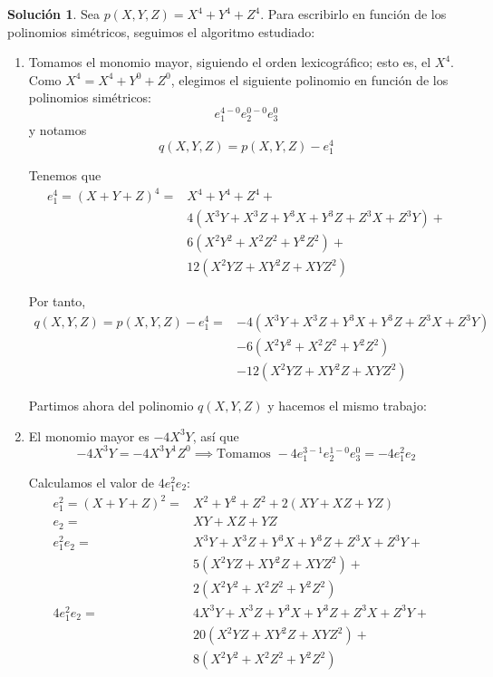 \documentclass[a4paper, 11pt]{article}
\theoremstyle{definition}
\newtheorem*{solucion}{Solución}
\theoremstyle{remark}
\begin{document}
  \begin{solucion}
      Sea $p(X,Y,Z) = X^4 + Y^4 + Z^4$. Para escribirlo en función de los polinomios simétricos, seguimos el algoritmo estudiado:

      \begin{enumerate}
          \item Tomamos el monomio mayor, siguiendo el orden lexicográfico; esto es, el $X^4$.
          Como $X^4 = X^4 + Y^0 + Z^0$, elegimos el siguiente polinomio en función de los polinomios simétricos:
          \[
          e_1^{4-0}e_2^{0-0}e_3^0
          \]
          y notamos
          \[
          q(X,Y,Z) = p(X,Y,Z) - e_1^4
          \]

          Tenemos que
          \begin{align*}
              e_1^4 = (X+Y+Z)^4 = &X^4 + Y^4 + Z^4 +\\
                      &4(X^3Y + X^3Z + Y^3X + Y^3Z + Z^3X + Z^3Y) +\\
                      &6(X^2Y^2 + X^2Z^2 + Y^2Z^2) +\\
                      &12(X^2YZ + XY^2Z + XYZ^2)
          \end{align*}

          Por tanto,
          \begin{align*}
              q(X,Y,Z) = p(X,Y,Z) - e_1^4 = &-4(X^3Y + X^3Z + Y^3X + Y^3Z + Z^3X + Z^3Y)\\
                                            &-6(X^2Y^2 + X^2Z^2 + Y^2Z^2)\\
                                            &-12(X^2YZ + XY^2Z + XYZ^2)
          \end{align*}

          Partimos ahora del polinomio $q(X,Y,Z)$ y hacemos el mismo trabajo:

          \item El monomio mayor es $-4X^3Y$, así que
          \[
          -4X^3Y = -4X^3Y^1Z^0 \implies \textrm{Tomamos } -4e_1^{3-1}e_2^{1-0}e_3^0 = -4e_1^2e_2
          \]

          Calculamos el valor de $4e_1^2e_2$:
          \begin{align*}
              e_1^2 = (X+Y+Z)^2 = &X^2+Y^2+Z^2 + 2(XY+XZ+YZ)\\
              e_2               = &XY + XZ + YZ&\\
              e_1^2e_2          = &X^3Y + X^3Z + Y^3X + Y^3Z + Z^3X + Z^3Y +\\
                                  &5(X^2YZ + XY^2Z + XYZ^2) +\\
                                  &2(X^2Y^2 + X^2Z^2 + Y^2Z^2)\\
              4e_1^2e_2          = &4X^3Y + X^3Z + Y^3X + Y^3Z + Z^3X + Z^3Y +\\
                                  &20(X^2YZ + XY^2Z + XYZ^2) +\\
                                  &8(X^2Y^2 + X^2Z^2 + Y^2Z^2)
          \end{align*}


\end{enumerate}
\end{solucion}
\end{document}
